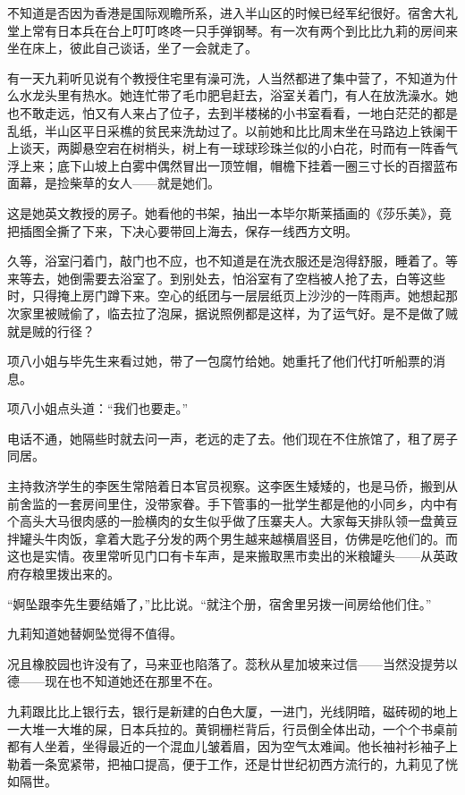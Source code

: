 \par 不知道是否因为香港是国际观瞻所系，进入半山区的时候已经军纪很好。宿舍大礼堂上常有日本兵在台上叮叮咚咚一只手弹钢琴。有一次有两个到比比九莉的房间来坐在床上，彼此自己谈话，坐了一会就走了。
\par 有一天九莉听见说有个教授住宅里有澡可洗，人当然都进了集中营了，不知道为什么水龙头里有热水。她连忙带了毛巾肥皂赶去，浴室关着门，有人在放洗澡水。她也不敢走远，怕又有人来占了位子，去到半楼梯的小书室看看，一地白茫茫的都是乱纸，半山区平日采樵的贫民来洗劫过了。以前她和比比周末坐在马路边上铁阑干上谈天，两脚悬空宕在树梢头，树上有一球球珍珠兰似的小白花，时而有一阵香气浮上来；底下山坡上白雾中偶然冒出一顶笠帽，帽檐下挂着一圈三寸长的百摺蓝布面幕，是捡柴草的女人——就是她们。
\par 这是她英文教授的房子。她看他的书架，抽出一本毕尔斯莱插画的《莎乐美》，竟把插图全撕了下来，下决心要带回上海去，保存一线西方文明。
\par 久等，浴室闩着门，敲门也不应，也不知道是在洗衣服还是泡得舒服，睡着了。等来等去，她倒需要去浴室了。到别处去，怕浴室有了空档被人抢了去，白等这些时，只得掩上房门蹲下来。空心的纸团与一层层纸页上沙沙的一阵雨声。她想起那次家里被贼偷了，临去拉了泡屎，据说照例都是这样，为了运气好。是不是做了贼就是贼的行径？
\par 项八小姐与毕先生来看过她，带了一包腐竹给她。她重托了他们代打听船票的消息。
\par 项八小姐点头道：“我们也要走。”
\par 电话不通，她隔些时就去问一声，老远的走了去。他们现在不住旅馆了，租了房子同居。
\par 主持救济学生的李医生常陪着日本官员视察。这李医生矮矮的，也是马侨，搬到从前舍监的一套房间里住，没带家眷。手下管事的一批学生都是他的小同乡，内中有个高头大马很肉感的一脸横肉的女生似乎做了压寨夫人。大家每天排队领一盘黄豆拌罐头牛肉饭，拿着大匙子分发的两个男生越来越横眉竖目，仿佛是吃他们的。而这也是实情。夜里常听见门口有卡车声，是来搬取黑市卖出的米粮罐头——从英政府存粮里拨出来的。
\par “婀坠跟李先生要结婚了，”比比说。“就注个册，宿舍里另拨一间房给他们住。”
\par 九莉知道她替婀坠觉得不值得。
\par 况且橡胶园也许没有了，马来亚也陷落了。蕊秋从星加坡来过信——当然没提劳以德——现在也不知道她还在那里不在。
\par 九莉跟比比上银行去，银行是新建的白色大厦，一进门，光线阴暗，磁砖砌的地上一大堆一大堆的屎，日本兵拉的。黄铜栅栏背后，行员倒全体出动，一个个书桌前都有人坐着，坐得最近的一个混血儿皱着眉，因为空气太难闻。他长袖衬衫袖子上勒着一条宽紧带，把袖口提高，便于工作，还是廿世纪初西方流行的，九莉见了恍如隔世。
